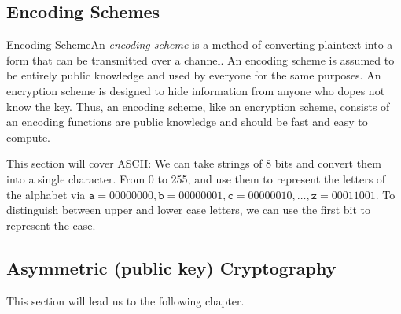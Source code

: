 \subsection{Encoding Schemes}

\begin{definition}
    {Encoding Scheme}An \textit{encoding scheme} is a method of converting plaintext into a form that can be transmitted over a channel. An encoding scheme is assumed to be entirely public knowledge and used by everyone for the same purposes. An encryption scheme is designed to hide information from anyone who dopes not know the key. Thus, an encoding scheme, like an encryption scheme, consists of an encoding functions are public knowledge and should be fast and easy to compute. 
\end{definition}

This section will cover ASCII\@: We can take strings of 8 bits and convert them into a single character. From 0 to 255, and use them to represent the letters of the alphabet via \(\texttt{a} = 00000000, \texttt{b} = 00000001, \texttt{c} = 00000010, \dots, \texttt{z} = 00011001\). To distinguish between upper and lower case letters, we can use the first bit to represent the case.


\subsection{Asymmetric (public key) Cryptography}

This section will lead us to the following chapter.